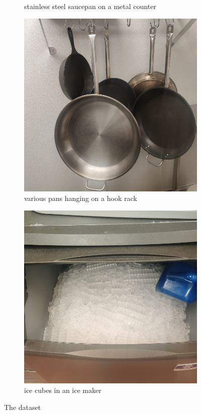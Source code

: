 \documentclass[]{article}
\begin{document}
\begin{figure}[h]
\begin{subfigure}[b]{0.2\textwidth}
        \caption{stainless steel saucepan on a metal counter}
    \end{subfigure}
    \begin{subfigure}[b]{0.2\textwidth}
        \centering
        \includegraphics[width=\textwidth]{dataset/8.jpg}
        \caption{various pans hanging on a hook rack}
    \end{subfigure}
    \begin{subfigure}[b]{0.2\textwidth}
        \centering
        \includegraphics[width=\textwidth]{dataset/9.jpg}
        \caption{ice cubes in an ice maker}
    \end{subfigure}
    \caption{The dataset}
\end{figure}
\clearpage
\end{document}
